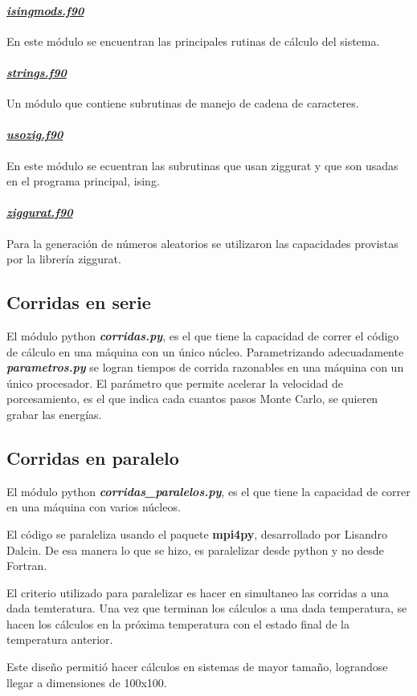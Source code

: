 \paragraph{\underline{\textit{isingmods.f90}}} 
En este m\'odulo  se encuentran las principales rutinas de c\'alculo del
sistema.


\paragraph{\underline{\textit{strings.f90}}}
Un m\'odulo que contiene subrutinas de manejo de cadena de caracteres.


\paragraph{\underline{\textit{usozig.f90}}} 
En este m\'odulo se ecuentran las subrutinas que usan ziggurat y que
son usadas en el programa principal, ising.
					
					
\paragraph{\underline{\textit{ziggurat.f90}}}

Para la generaci\'on de n\'umeros aleatorios se utilizaron
las capacidades provistas por la librer\'ia ziggurat. 


\subsection{Corridas en serie}\label{serie}
El módulo python \textbf{\textit{corridas.py}}, es el que tiene la capacidad de correr
el código de cálculo en una máquina con un único núcleo. Parametrizando adecuadamente
\textbf{\textit{parametros.py}} se logran tiempos de corrida razonables en una máquina
con un único procesador. El parámetro que permite acelerar la velocidad de porcesamiento, 
es el que indica cada cuantos pasos Monte Carlo, se quieren grabar las energías.

\subsection{Corridas en paralelo}\label{paralelo}

El módulo python \textbf{\textit{corridas\_paralelos.py}}, es el que tiene la 
capacidad de correr
en una máquina con varios núcleos.

El código se paraleliza usando el paquete \textbf{mpi4py}, desarrollado por Lisandro Dalcin.
De esa manera lo que se hizo, es paralelizar desde python y no desde Fortran.

El criterio utilizado para paralelizar es hacer en simultaneo  las corridas a una dada temteratura. 
Una vez que terminan los cálculos a una dada temperatura, se hacen los cálculos en la próxima
temperatura con el estado final de la temperatura anterior.

Este diseño permitió hacer cálculos en sistemas de mayor tamaño, lograndose llegar a dimensiones
de 100x100.

